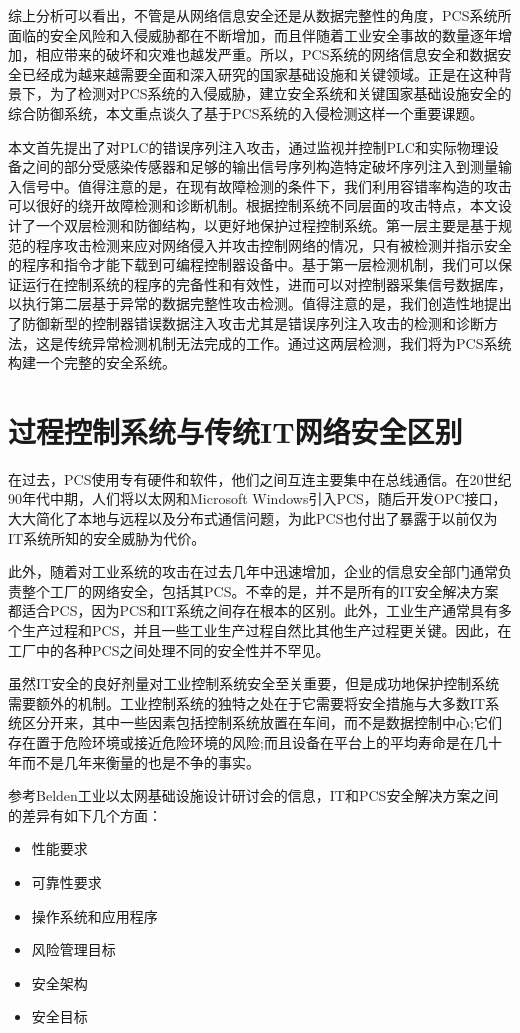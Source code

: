 综上分析可以看出，不管是从网络信息安全还是从数据完整性的角度，PCS系统所面临的安全风险和入侵威胁都在不断增加，而且伴随着工业安全事故的数量逐年增加，相应带来的破坏和灾难也越发严重。所以，PCS系统的网络信息安全和数据安全已经成为越来越需要全面和深入研究的国家基础设施和关键领域。正是在这种背景下，为了检测对PCS系统的入侵威胁，建立安全系统和关键国家基础设施安全的综合防御系统，本文重点谈久了基于PCS系统的入侵检测这样一个重要课题。

本文首先提出了对PLC的错误序列注入攻击，通过监视并控制PLC和实际物理设备之间的部分受感染传感器和足够的输出信号序列构造特定破坏序列注入到测量输入信号中。值得注意的是，在现有故障检测的条件下，我们利用容错率构造的攻击可以很好的绕开故障检测和诊断机制。根据控制系统不同层面的攻击特点，本文设计了一个双层检测和防御结构，以更好地保护过程控制系统。第一层主要是基于规范的程序攻击检测来应对网络侵入并攻击控制网络的情况，只有被检测并指示安全的程序和指令才能下载到可编程控制器设备中。基于第一层检测机制，我们可以保证运行在控制系统的程序的完备性和有效性，进而可以对控制器采集信号数据库，以执行第二层基于异常的数据完整性攻击检测。值得注意的是，我们创造性地提出了防御新型的控制器错误数据注入攻击尤其是错误序列注入攻击的检测和诊断方法，这是传统异常检测机制无法完成的工作。通过这两层检测，我们将为PCS系统构建一个完整的安全系统。

\section{过程控制系统与传统IT网络安全区别}


在过去，PCS使用专有硬件和软件，他们之间互连主要集中在总线通信。在20世纪90年代中期，人们将以太网和Microsoft Windows引入PCS，随后开发OPC接口，大大简化了本地与远程以及分布式通信问题，为此PCS也付出了暴露于以前仅为IT系统所知的安全威胁为代价。

此外，随着对工业系统的攻击在过去几年中迅速增加，企业的信息安全部门通常负责整个工厂的网络安全，包括其PCS。不幸的是，并不是所有的IT安全解决方案都适合PCS，因为PCS和IT系统之间存在根本的区别。此外，工业生产通常具有多个生产过程和PCS，并且一些工业生产过程自然比其他生产过程更关键。因此，在工厂中的各种PCS之间处理不同的安全性并不罕见。

虽然IT安全的良好剂量对工业控制系统安全至关重要，但是成功地保护控制系统需要额外的机制。工业控制系统的独特之处在于它需要将安全措施与大多数IT系统区分开来，其中一些因素包括控制系统放置在车间，而不是数据控制中心;它们存在置于危险环境或接近危险环境的风险;而且设备在平台上的平均寿命是在几十年而不是几年来衡量的也是不争的事实。

参考Belden工业以太网基础设施设计研讨会的信息，IT和PCS安全解决方案之间的差异有如下几个方面：
\begin{itemize}
	\item 性能要求
	\item 可靠性要求
	\item 操作系统和应用程序
	\item 风险管理目标
	\item 安全架构
	\item 安全目标
\end{itemize}


